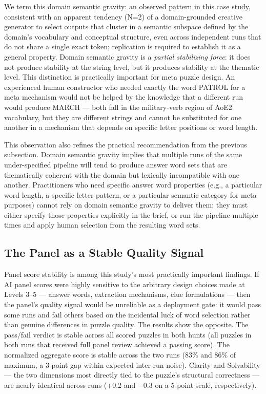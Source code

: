 We term this domain semantic gravity: an observed pattern in this case study, consistent with an apparent tendency (N=2) of a domain-grounded creative generator to select outputs that cluster in a semantic subspace defined by the domain's vocabulary and conceptual structure, even across independent runs that do not share a single exact token; replication is required to establish it as a general property. Domain semantic gravity is a \textit{partial stabilizing force}: it does not produce stability at the string level, but it produces stability at the thematic level. This distinction is practically important for meta puzzle design. An experienced human constructor who needed exactly the word PATROL for a meta mechanism would not be helped by the knowledge that a different run would produce MARCH --- both fall in the military-verb region of AoE2 vocabulary, but they are different strings and cannot be substituted for one another in a mechanism that depends on specific letter positions or word length.

This observation also refines the practical recommendation from the previous subsection. Domain semantic gravity implies that multiple runs of the same under-specified pipeline will tend to produce answer word sets that are thematically coherent with the domain but lexically incompatible with one another. Practitioners who need specific answer word properties (e.g., a particular word length, a specific letter pattern, or a particular semantic category for meta purposes) cannot rely on domain semantic gravity to deliver them; they must either specify those properties explicitly in the brief, or run the pipeline multiple times and apply human selection from the resulting word sets.

\subsection{The Panel as a Stable Quality Signal}

Panel score stability is among this study's most practically important findings. If AI panel scores were highly sensitive to the arbitrary design choices made at Levels 3--5 --- answer words, extraction mechanisms, clue formulations --- then the panel's quality signal would be unreliable as a deployment gate: it would pass some runs and fail others based on the incidental luck of word selection rather than genuine differences in puzzle quality. The results show the opposite. The pass/fail verdict is stable across all scored puzzles in both hunts (all puzzles in both runs that received full panel review achieved a passing score). The normalized aggregate score is stable across the two runs (83\% and 86\% of maximum, a 3-point gap within expected inter-run noise). Clarity and Solvability --- the two dimensions most directly tied to the puzzle's structural correctness --- are nearly identical across runs (+0.2 and $-$0.3 on a 5-point scale, respectively).

